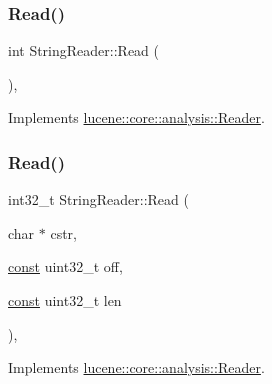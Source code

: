 \subsubsection{\texorpdfstring{Read()}{Read()}\hspace{0.1cm}{\footnotesize\ttfamily [1/2]}}
{\footnotesize\ttfamily int String\+Reader\+::\+Read (\begin{DoxyParamCaption}{ }\end{DoxyParamCaption})\hspace{0.3cm}{\ttfamily [override]}, {\ttfamily [virtual]}}



Implements \mbox{\hyperlink{classlucene_1_1core_1_1analysis_1_1Reader_ae8e04911b6a4c06bb026ca6e74071cb2}{lucene\+::core\+::analysis\+::\+Reader}}.

\mbox{\label{classlucene_1_1core_1_1analysis_1_1StringReader_ab048d6d6d759175eeda5321a480995c3}} 
\subsubsection{\texorpdfstring{Read()}{Read()}\hspace{0.1cm}{\footnotesize\ttfamily [2/2]}}
{\footnotesize\ttfamily int32\+\_\+t String\+Reader\+::\+Read (\begin{DoxyParamCaption}\item[{char $\ast$}]{cstr,  }\item[{\mbox{\hyperlink{ZlibCrc32_8h_a2c212835823e3c54a8ab6d95c652660e}{const}} uint32\+\_\+t}]{off,  }\item[{\mbox{\hyperlink{ZlibCrc32_8h_a2c212835823e3c54a8ab6d95c652660e}{const}} uint32\+\_\+t}]{len }\end{DoxyParamCaption})\hspace{0.3cm}{\ttfamily [override]}, {\ttfamily [virtual]}}



Implements \mbox{\hyperlink{classlucene_1_1core_1_1analysis_1_1Reader_a986e25a49a947dc113a22c6de033ebe9}{lucene\+::core\+::analysis\+::\+Reader}}.

\mbox{\label{classlucene_1_1core_1_1analysis_1_1StringReader_a5bf198e593389f1255ec7a4f69f3187d}} 
